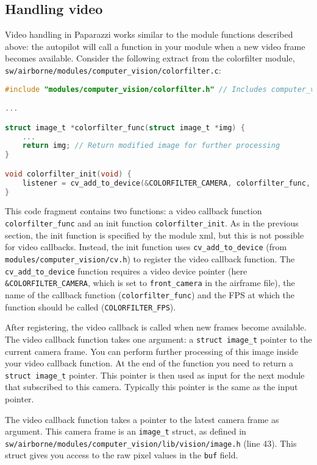 \documentclass{article}
\begin{document}
\subsection{Handling video}\label{sec:video}
Video handling in Paparazzi works similar to the module functions described above: the autopilot will call a function in your module when a new video frame becomes available. Consider the following extract from the colorfilter module, \texttt{sw/airborne/modules/computer\_vision/colorfilter.c}:
\begin{lstlisting}[language=c]
#include "modules/computer_vision/colorfilter.h" // Includes computer_vision/cv.h!

...

struct image_t *colorfilter_func(struct image_t *img) {
	...
	return img; // Return modified image for further processing
}

void colorfilter_init(void) {
	listener = cv_add_to_device(&COLORFILTER_CAMERA, colorfilter_func, COLORFILTER_FPS);
}
\end{lstlisting}
This code fragment contains two functions: a video callback function \texttt{colorfilter\_func} and an init function \texttt{colorfilter\_init}.
As in the previous section, the init function is specified by the module xml, but this is not possible for video callbacks.
Instead, the init function uses \texttt{cv\_add\_to\_device} (from \texttt{modules/computer\_vision/cv.h}) to register the video callback function. The \texttt{cv\_add\_to\_device} function requires a video device pointer (here \texttt{\&COLORFILTER\_CAMERA}, which is set to \texttt{front\_camera} in the airframe file), the name of the callback function (\texttt{colorfilter\_func}) and the FPS at which the function should be called (\texttt{COLORFILTER\_FPS}).

After registering, the video callback is called when new frames become available.
The video callback function takes one argument: a \texttt{struct image\_t} pointer to the current camera frame. You can perform further processing of this image inside your video callback function.
At the end of the function you need to return a \texttt{struct image\_t} pointer. This pointer is then used as input for the next module that subscribed to this camera. Typically this pointer is the same as the input pointer.

The video callback function takes a pointer to the latest camera frame as argument.
This camera frame is an \texttt{image\_t} struct, as defined in \texttt{sw/airborne/modules/computer\_vision/lib/vision/image.h} (line 43).
This struct gives you access to the raw pixel values in the \texttt{buf} field.
\end{document}
